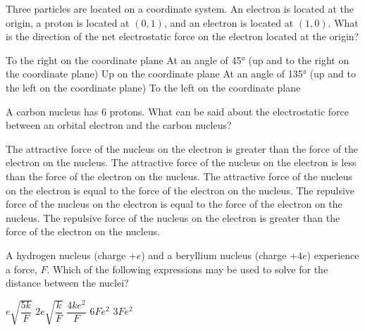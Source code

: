 \documentclass{../../../oss-ap12ibhl}
\begin{document}
\begin{questions}
  \question Three particles are located on a coordinate system. An electron is
  located at the origin, a proton is located at $(0,1)$, and an electron is
  located at $(1,0)$. What is the direction of the net electrostatic force on
  the electron located at the origin?
  \begin{choices}
    \choice To the right on the coordinate plane
    \choice At an angle of \ang{45} (up and to the right on the coordinate
    plane)
    \choice Up on the coordinate plane
    \choice At an angle of \ang{135} (up and to the left on the coordinate
    plane)
    \choice To the left on the coordinate plane
  \end{choices}
  \newpage
     
  \question A carbon nucleus has 6 protons. What can be said about the
  electrostatic force between an orbital electron and the carbon nucleus?
  \begin{choices}
    \choice The attractive force of the nucleus on the electron is greater than
    the force of the electron on the nucleus.
    \choice The attractive force of the nucleus on the electron is less than the
    force of the electron on the nucleus.
    \choice The attractive force of the nucleus on the electron is equal to the
    force of the electron on the nucleus.
    \choice The repulsive force of the nucleus on the electron is equal to the
    force of the electron on the nucleus.
    \choice The repulsive force of the nucleus on the electron is greater than
    the force of the electron on the nucleus.
  \end{choices}
  \vspace{.7in}
    
  \question A hydrogen nucleus (charge $+e$) and a beryllium nucleus (charge
  $+4e$) experience a force, $F$. Which of the following expressions may be
  used to solve for the distance between the nuclei?

  \begin{oneparchoices}
    \choice$e\sqrt{\dfrac{5k}F}$\hspace{.3in}
    \choice$2e\sqrt{\dfrac{k}F}$\hspace{.3in}
    \choice$\dfrac{4ke^2}F$\hspace{.3in}
    \choice$6Fe^2$\hspace{.3in}
    \choice$3Fe^2$
  \end{oneparchoices}
  \vspace{.5in}
     

\end{questions}
\end{document}
